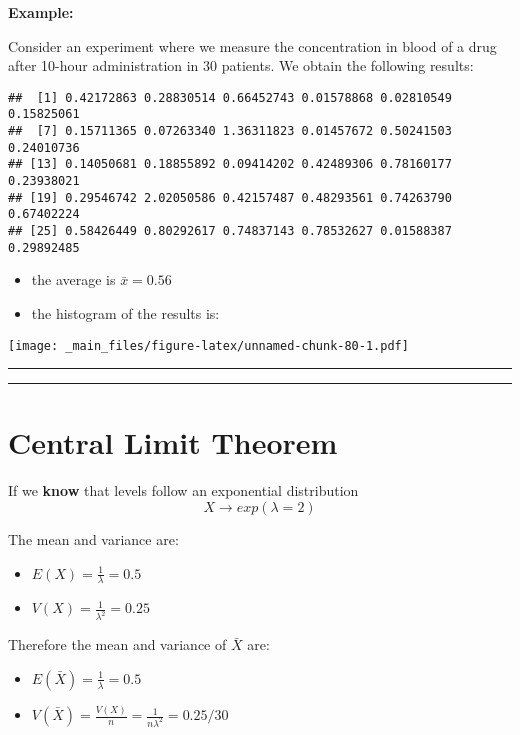 \documentclass[
]{book}
\providecommand{\tightlist}{%
  \setlength{\itemsep}{0pt}\setlength{\parskip}{0pt}}
\begin{document}
\textbf{Example:}

Consider an experiment where we measure the concentration in blood of a drug after 10-hour administration in \(30\) patients. We obtain the following results:

\begin{verbatim}
##  [1] 0.42172863 0.28830514 0.66452743 0.01578868 0.02810549 0.15825061
##  [7] 0.15711365 0.07263340 1.36311823 0.01457672 0.50241503 0.24010736
## [13] 0.14050681 0.18855892 0.09414202 0.42489306 0.78160177 0.23938021
## [19] 0.29546742 2.02050586 0.42157487 0.48293561 0.74263790 0.67402224
## [25] 0.58426449 0.80292617 0.74837143 0.78532627 0.01588387 0.29892485
\end{verbatim}

\begin{itemize}
\item
  the average is \(\bar{x}=0.56\)
\item
  the histogram of the results is:
\end{itemize}

\texttt{[image: \_main\_files/figure-latex/unnamed-chunk-80-1.pdf]}

\begin{center}\rule{0.5\linewidth}{0.5pt}\end{center}

\begin{center}\rule{0.5\linewidth}{0.5pt}\end{center}

\hypertarget{central-limit-theorem-3}{%
\section{Central Limit Theorem}\label{central-limit-theorem-3}}

If we \textbf{know} that levels follow an exponential distribution \[X \rightarrow exp(\lambda=2)\]

The mean and variance are:

\begin{itemize}
\tightlist
\item
  \(E(X)=\frac{1}{\lambda}=0.5\)
\item
  \(V(X)=\frac{1}{\lambda^2}=0.25\)
\end{itemize}

Therefore the mean and variance of \(\bar{X}\) are:

\begin{itemize}
\tightlist
\item
  \(E(\bar{X})=\frac{1}{\lambda}=0.5\)
\item
  \(V(\bar{X})=\frac{V(X)}{n}=\frac{1}{n\lambda^2}=0.25/30\)
\end{itemize}
\end{document}
